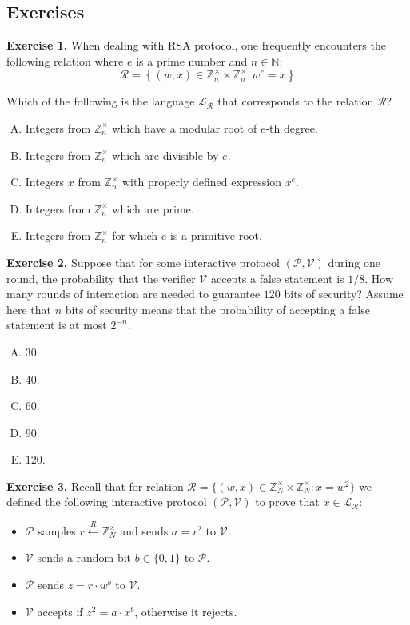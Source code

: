 \documentclass[../lecture-notes.tex]{subfiles}
\begin{document}
\newpage
\subsection{Exercises}

\textbf{Exercise 1.} When dealing with RSA protocol, one frequently encounters the following relation where $e$ is a prime number and $n \in \mathbb{N}$:
\begin{equation*}
    \mathcal{R} = \left\{ (w, x) \in \mathbb{Z}_n^{\times} \times \mathbb{Z}_n^{\times}: w^e = x \right\}
\end{equation*}

Which of the following is the language $\mathcal{L}_{\mathcal{R}}$ that corresponds to the relation $\mathcal{R}$?
\begin{enumerate}[(A)]
    \item Integers from $\mathbb{Z}_n^{\times}$ which have a modular root of $e$-th degree.
    \item Integers from $\mathbb{Z}_n^{\times}$ which are divisible by $e$.
    \item Integers $x$ from $\mathbb{Z}_n^{\times}$ with properly defined expression $x^e$.
    \item Integers from $\mathbb{Z}_n^{\times}$ which are prime.
    \item Integers from $\mathbb{Z}_n^{\times}$ for which $e$ is a primitive root.
\end{enumerate}

\textbf{Exercise 2.} Suppose that for some interactive protocol $(\mathcal{P}, \mathcal{V})$ during one round, the probability that the verifier $\mathcal{V}$ accepts a false statement is $1/8$. How many rounds of interaction are needed to guarantee $120$ bits of security? Assume here that $n$ bits of security means that the probability of accepting a false statement is at most $2^{-n}$.
\begin{enumerate}[(A)]
    \item $30$.
    \item $40$.
    \item $60$.
    \item $90$.
    \item $120$.
\end{enumerate}

\textbf{Exercise 3.} Recall that for relation $\mathcal{R} = \{(w,x) \in \mathbb{Z}_N^{\times} \times \mathbb{Z}_N^{\times}: x = w^2\}$ we defined the following interactive protocol $(\mathcal{P}, \mathcal{V})$ to prove that $x \in \mathcal{L}_{\mathcal{R}}$:
\begin{itemize}
    \item $\mathcal{P}$ samples $r \xleftarrow{R} \mathbb{Z}_N^{\times}$ and sends $a = r^2$ to $\mathcal{V}$.
    \item $\mathcal{V}$ sends a random bit $b \in \{0,1\}$ to $\mathcal{P}$.
    \item $\mathcal{P}$ sends $z = r \cdot w^b$ to $\mathcal{V}$.
    \item $\mathcal{V}$ accepts if $z^2 = a \cdot x^b$, otherwise it rejects.
\end{itemize}
\end{document}
